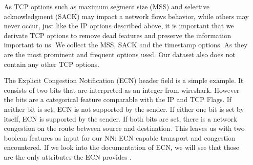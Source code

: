 \documentclass[
	ngerman,
	ruledheaders=section,%
	class=report,%
	thesis={type=bachelor},%
	accentcolor=9c,%
	custommargins=true,%
	marginpar=false,%
	parskip=half-,%
	fontsize=11pt,%
]{tudapub}
\begin{document}
As TCP options such as maximum segment size (MSS) and selective acknowledgment (SACK) may impact a network flows behavior,
while others may never occur, just like the IP options described above,
it is important that we derivate TCP options to remove dead features and preserve the information important to us.
We collect the MSS, SACK and the timestamp options.
As they are the most prominent and frequent options used.
Our dataset also does not contain any other TCP options.

The Explicit Congestion Notification (ECN) \cite{floydAdditionExplicitCongestion} header field is a simple example.
It consists of two bits that are interpreted as an integer from wireshark.
However the bits are a categorical feature comparable with the IP and TCP Flags.
If neither bit is set, ECN is not supported by the sender.
If either one bit is set by itself, ECN is supported by the sender.
If both bits are set, there is a network congestion on the route between source and destination.
This leaves us with two boolean features as input for our NN: ECN capable transport and congestion encountered.
If we look into the documentation of ECN, we will see that those are the only attributes the ECN provides \cite{DifferentiatedServicesField}.
\end{document}
